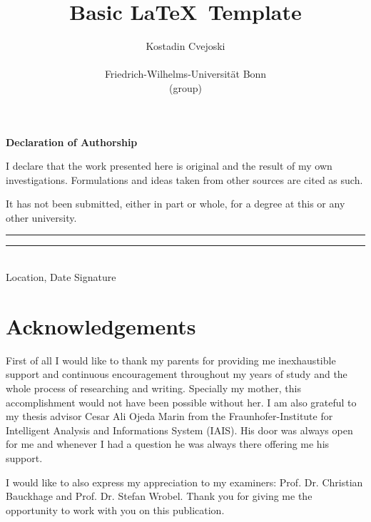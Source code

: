 \documentclass[12pt, %
abstract=on %
]{scrreprt} %
\theoremstyle{definition}
\theoremstyle{remark}
\begin{document}
     \pagestyle{headings}  %
    \title{Basic \LaTeX \, Template}
    \author{Kostadin Cvejoski\\ \begin{minipage}{8cm}\centering \small 
Friedrich-Wilhelms-Universität Bonn\\ \small (group)\end{minipage}}

    \vspace{4cm}

    \cleardoublepage
    \thispagestyle{empty}
    {\noindent%
        \huge{\textbf{\textsf{Declaration of Authorship}}}
    }
    \vspace{2cm}
    \begin{flushleft}
        \noindent%
        I declare that the work presented here is original and the result of my own investigations.
        Formulations and ideas taken from other sources are cited as such.

        It has not been submitted, either in part or whole, for a degree at this or any other university.
    \end{flushleft}

    \vspace{8cm}
    \noindent%
    \rule[1em]{8em}{0.5pt}  \hfill \rule[1em]{8em}{0.5pt}\\ %
    Location, Date \hfill Signature\\


    \cleardoublepage
    
    \chapter*{Acknowledgements}
    
    First of all I would like to thank my parents for providing me inexhaustible support and continuous encouragement throughout my years of study and the whole 
process of researching and writing. Specially my mother, this accomplishment would not have been possible without her. I am also grateful to my thesis advisor Cesar Ali Ojeda Marin from the Fraunhofer-Institute for Intelligent Analysis and Informations System (IAIS). His door was always  open for me and whenever I had a question he was always there offering me his support. 
    
    I would like to also express my appreciation to my examiners: Prof. Dr. Christian Bauckhage and Prof. Dr. Stefan Wrobel. Thank you for giving me the opportunity to work with you on this publication. 
    
\end{document}
